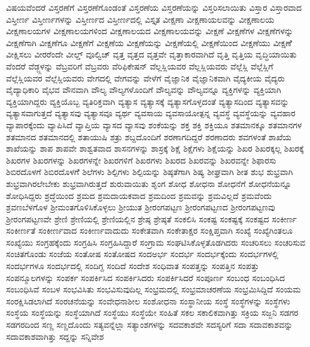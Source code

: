 {ವಿಷಯವೆಂದರೆ
ವಿಸ್ತರಣೆಗೆ
ವಿಸ್ತರಣೆಗೊಂಡಂತೆ
ವಿಸ್ತರಣೆಯ
ವಿಸ್ತರಣೆಯನ್ನು
ವಿಸ್ತರಿಸಲಾಯಿತು
ವಿಸ್ತಾರ
ವಿಸ್ತಾರವಾದ
ವಿಸ್ತೀರ್ಣ
ವಿಸ್ತೀರ್ಣಗಳನ್ನು
ವಿಸ್ತೀರ್ಣದ
ವಿಸ್ತೀರ್ಣದಲ್ಲಿ
ವಿಸ್ತೃತ
ವೀಕ್ಷಣಾ
ವೀಕ್ಷಣಾಯಲವನ್ನು
ವೀಕ್ಷಣಾಲಯ
ವೀಕ್ಷಣಾಲಯಗಳ
ವೀಕ್ಷಣಾಲಯಗಳಿಂದ
ವೀಕ್ಷಣಾಲಯದ
ವೀಕ್ಷಣಾಲಯವನ್ನು
ವೀಕ್ಷಣೆ
ವೀಕ್ಷಣೆಗಳ
ವೀಕ್ಷಣೆಗಳನ್ನು
ವೀಕ್ಷಣೆಗಾಗಿ
ವೀಕ್ಷಣೆಗೂ
ವೀಕ್ಷಣೆಗೆ
ವೀಕ್ಷಣೆಯ
ವೀಕ್ಷಣೆಯನ್ನು
ವೀಕ್ಷಣೆಯಲ್ಲಿ
ವೀಕ್ಷಣೆಯಿಂದ
ವೀಕ್ಷಣೆಯು
ವೀಕ್ಷಣೆೆ
ವೀಕ್ಷಿಸಲು
ವೀರರೆಂದೇ
ವೀಲ್ಡ್
ವೂಲ್ವಿಚ್
ವೃತ್ತ
ವೃತ್ತದ
ವೃತ್ತವೇ
ವೃತ್ತಾಕಾರವಾಗಿದೆ
ವೃತ್ತಿ
ವೃತ್ತಿಯ
ವೃದ್ಧಿಯಾಯಿತು
ವೆಂದರೆ
ವೆಡ್ಜ್ಗಳನ್ನು
ವೆಬ್ರವರಿಗೆ
ವೆಬ್ರವರು
ವೆರಿಫಿಕೇಷನ್
ವೆಲ್ಲಸ್ಲಿಯವರ
ವೆಲ್ಲಸ್ಲಿಯವರು
ವೆಲ್ಲೆಸ್ಲಿ
ವೆಲ್ಲೆಸ್ಲಿಗೆ
ವೆಲ್ಲೆಸ್ಲಿಯವರ
ವೆಲ್ಲೆಸ್ಲಿಯವರು
ವೇಗದಲ್ಲಿ
ವೇಗವನ್ನು
ವೇಳೆಗೆ
ವೈಜ್ಞಾನಿಕ
ವೈಜ್ಞಾನಿಕವಾಗಿ
ವೈದ್ಯಕೀಯ
ವೈದ್ಯರು
ವೈದ್ಯಾಧಿಕಾರಿ
ವೈಭವ
ವೌನವಾಗಿ
ವೌಲ್ಯ
ವೌಲ್ಯಗಳೊಂದಿಗೆ
ವೌಲ್ಯವನ್ನು
ವೌಲ್ಯವನ್ನೂ
ವ್ಯಕ್ತಿಗಳನ್ನು
ವ್ಯಕ್ತಿಯಾಗಿ
ವ್ಯಕ್ತಿಯಾಗಿದ್ದರು
ವ್ಯಕ್ತಿಯೊಬ್ಬ
ವ್ಯತಿರಿಕ್ತವಾಗಿ
ವ್ಯತ್ಯಾಸ
ವ್ಯತ್ಯಾಸಕ್ಕೆ
ವ್ಯತ್ಯಾಸಗೊಳ್ಳದಂತೆ
ವ್ಯತ್ಯಾಸದಿಂದ
ವ್ಯತ್ಯಾಸವನ್ನು
ವ್ಯತ್ಯಾಸವಾಗುತ್ತದೆ
ವ್ಯತ್ಯಾಸವು
ವ್ಯತ್ಯಾಸವೂ
ವ್ಯರ್ಥ
ವ್ಯವಸಾಯ
ವ್ಯವಸಾಯೋತ್ಪನ್ನ
ವ್ಯವಸ್ಥೆ
ವ್ಯವಸ್ಥೆಯನ್ನು
ವ್ಯವಹಾರ
ವ್ಯಾಪಾರಕ್ಕೆಂದು
ವ್ಯಾಪಿಸಿದೆ
ವ್ಯಾಪ್ತಿಯ
ವ್ಯಾಸದ
ವ್ಯಾಸವು
ಶಂಕೆಯನ್ನು
ಶಕ್ತ
ಶಕ್ತಿ
ಶಕ್ತಿಯೂ
ಶತಮಾನಕ್ಕೂ
ಶತಮಾನಗಳ
ಶತಮಾನದ
ಶತಮಾನದಲ್ಲಿ
ಶತಾಯುಷಿ
ಶತ್ರು
ಶಬ್ದದೊಂದಿಗೆ
ಶರಣಾಗದಿದ್ದರೆ
ಶರಣಾದರು
ಶವಗಳಂತೆ
ಶಾಖೆಯ
ಶಾಖೆಯನ್ನು
ಶಾಪ
ಶಾಪವೇ
ಶಾಶ್ವತವಾದ
ಶಾಸನಗಳನ್ನು
ಶಾಸ್ರಕ್ಕೆ
ಶಿಕ್ಷೆ
ಶಿಕ್ಷೆಗಳು
ಶಿಕ್ಷೆಯನ್ನು
ಶಿಖರ
ಶಿಖರಕ್ಕಲ್ಲ
ಶಿಖರಕ್ಕೆ
ಶಿಖರಗಳ
ಶಿಖರಗಳನ್ನು
ಶಿಖರಗಳನ್ನೇ
ಶಿಖರಗಳಿಗೆ
ಶಿಖರಗಳು
ಶಿಖರದ
ಶಿಖರವನ್ನು
ಶಿಖರವನ್ನೇ
ಶಿಫಾರಸು
ಶಿಬಿರದೊಳಗೆ
ಶಿಬಿರದೊಳಗೆೆ
ಶಿಲೆಗಳು
ಶಿಲ್ಪಿಗಳು
ಶಿಲ್ಪಿಯನ್ನು
ಶಿಷ್ಠತೆಗಾಗಿ
ಶಿಷ್ಯ
ಶೀಘ್ರವಾಗಿ
ಶೀತ
ಶುಭ
ಶುಭ್ರವಾಗಿ
ಶುಭ್ರವಾಗಿರಲೇಬೇಕು
ಶುಭ್ರವಾಗಿರುತ್ತದೆ
ಶುರುವಾಯಿತು
ಶೃಂಗ
ಶೋಧ
ಶೋಧನಾ
ಶೋಧನೆಗೆ
ಶೋಧನೆಯನ್ನೂ
ಶೋಧಿಸಿದ್ದರು
ಶ್ರದ್ಧೆಯಿಂದ
ಶ್ರಮದ
ಶ್ರಮದಾಯಕವಾದ
ಶ್ರಮದಿಂದ
ಶ್ರಮವನ್ನು
ಶ್ರಮವಿಲ್ಲದೆ
ಶ್ರಮವೆಂದು
ಶ್ರವಣಬೆಳಗೊಳ
ಶ್ರೀಮಂತಗೊಳಿಸಿಕೊಳ್ಳಲು
ಶ್ರೀಯುತ
ಶ್ರೀರಂಗಪಟ್ಟಣ
ಶ್ರೀರಂಗಪಟ್ಟಣದ
ಶ್ರೀರಂಗಪಟ್ಟಣವು
ಶ್ರೀರಂಗಪಟ್ಟಣವೇ
ಶ್ರೇಣಿ
ಶ್ರೇಣಿಯಲ್ಲಿ
ಶ್ರೇಣಿಯಲ್ಲಿನ
ಶ್ರೇಷ್ಠ
ಶ್ರೇಷ್ಠತೆ
ಸಂಕಲಿಸಿ
ಸಂಕಷ್ಟ
ಸಂಕಷ್ಟಕ್ಕೆ
ಸಂಕಷ್ಟದ
ಸಂಕೀರ್ಣ
ಸಂಕೀರ್ಣತೆ
ಸಂಕೀರ್ಣವಾದ
ಸಂಕೀರ್ಣವಾದುದು
ಸಂಕೇತವಾಗಿ
ಸಂಕೇತಾಕ್ಷರ
ಸಂಕ್ಷಿಪ್ತವಾಗಿ
ಸಂಖ್ಯೆ
ಸಂಖ್ಯೆಗಿಂತಲೂ
ಸಂಖ್ಯೆಯು
ಸಂಗ್ರಹಕ್ಕೆಂದು
ಸಂಗ್ರಹಿಸಿ
ಸಂಗ್ರಹಿಸಿದ್ದಾರೆ
ಸಂಗ್ರಾಮ
ಸಂಘಟಿಸಿಕೊಳ್ಳತೊಡಗಿದರು
ಸಂಚರಿಸಲು
ಸಂಚರಿಸುವ
ಸಂಚಿತಗೊಂಡು
ಸಂಜೆಯ
ಸಂತೋಷ
ಸಂತೋಷದ
ಸಂದಅರ್ಭ
ಸಂದರ್ಭ
ಸಂದರ್ಭಕ್ಕೆಂದು
ಸಂದರ್ಭಗಳಲ್ಲಿ
ಸಂದರ್ಭಗಳೂ
ಸಂದರ್ಭದಲ್ಲಿ
ಸಂದಿಗ್ದ
ಸಂದಿದೆ
ಸಂದೇಶ
ಸಂಧಿವಾತ
ಸಂಪತ್ತನ್ನು
ಸಂಪತ್ತಿನ
ಸಂಪತ್ತು
ಸಂಪನ್ಮೂಲಗಳನ್ನು
ಸಂಪರ್ಕ
ಸಂಪರ್ಕಿಸಿದ
ಸಂಪರ್ಕಿಸಿದರು
ಸಂಪರ್ಕಿಸಿದರೆ
ಸಂಪೂರ್ಣ
ಸಂಬಂಧ
ಸಂಬಂಧಿಸಿದ
ಸಂಬಂಧಿಸಿವೆ
ಸಂಬಳ
ಸಂಭವಿಸಿತು
ಸಂಭವಿಸುವುದಿಲ್ಲ
ಸಂಭ್ರಮದಲ್ಲಿ
ಸಂಭ್ರಮಾಚರಣೆಯ
ಸಂಭ್ರಮಿಸಿದ್ದಿದೆ
ಸಂಯಮ
ಸಂರಕ್ಷಿಸಿಡಲಾಗಿದೆ
ಸಂರಚನೆಯನ್ನು
ಸಂವೇಧನಾಶೀಲ
ಸಂಶೋಧನಾ
ಸಂಸ್ಥಾನೀಯ
ಸಂಸ್ಥೆ
ಸಂಸ್ಥೆಗಳನ್ನು
ಸಂಸ್ಥೆಗಳು
ಸಂಸ್ಥೆಯ
ಸಂಸ್ಥೆಯನ್ನು
ಸಂಸ್ಥೆಯಾಗಿದೆ
ಸಂಸ್ಥೆಯು
ಸಂಸ್ಥೆಯೇ
ಸಂಹಿತೆ
ಸಕಲ
ಸಕಾಲಿಕವಾಗಿತ್ತು
ಸಕ್ರಿಯ
ಸಜ್ಜನಿ
ಸಡಗರ
ಸಡಗರದಿಂದ
ಸಣ್ಣ
ಸಣ್ಣದೊಂದು
ಸತ್ಯವನ್ನೆಲ್ಲಾ
ಸತ್ಯಾಂಶಗಳನ್ನು
ಸದವಕಾಶವೇ
ಸದಸ್ಯರಿಗೆ
ಸದಾ
ಸದಾವಕಾಶವನ್ನು
ಸದಾವಕಾಶವಾಗಿತ್ತು
ಸದ್ದನ್ನು
ಸನ್ನಿವೇಶ
}
